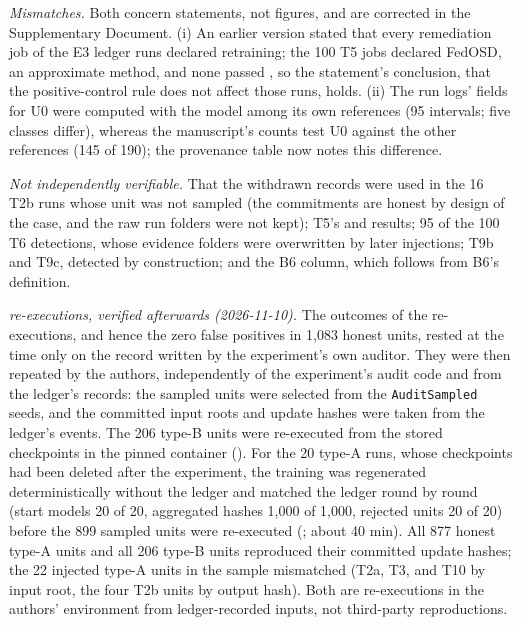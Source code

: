 \emph{Mismatches.} Both concern statements, not figures, and are corrected in the Supplementary Document. (i) An earlier version stated that every remediation job of the E3 ledger runs declared retraining; the 100 T5 jobs declared FedOSD, an approximate method, and none passed \Lthree{}, so the statement's conclusion, that the positive-control rule does not affect those runs, holds. (ii) The run logs' \Lthree{} fields for U0 were computed with the model among its own references (95 intervals; five classes differ), whereas the manuscript's counts test U0 against the other references (145 of 190); the provenance table now notes this difference.

\emph{Not independently verifiable.} That the withdrawn records were used in the 16 T2b runs whose unit was not sampled (the commitments are honest by design of the case, and the raw run folders were not kept); T5's \Lone{} and \Ltwo{} results; 95 of the 100 T6 detections, whose evidence folders were overwritten by later injections; T9b and T9c, detected by construction; and the B6 column, which follows from B6's definition.

\emph{\Lone{} re-executions, verified afterwards (2026-11-10).} The outcomes of the \Lone{} re-executions, and hence the zero false positives in 1,083 honest units, rested at the time only on the record written by the experiment's own auditor. They were then repeated by the authors, independently of the experiment's audit code and from the ledger's records: the sampled units were selected from the \texttt{AuditSampled} seeds, and the committed input roots and update hashes were taken from the ledger's events. The 206 type-B units were re-executed from the stored checkpoints in the pinned container (). For the 20 type-A runs, whose checkpoints had been deleted after the experiment, the training was regenerated deterministically without the ledger and matched the ledger round by round (start models 20 of 20, aggregated hashes 1,000 of 1,000, rejected units 20 of 20) before the 899 sampled units were re-executed (; about 40 min). All 877 honest type-A units and all 206 type-B units reproduced their committed update hashes; the 22 injected type-A units in the sample mismatched (T2a, T3, and T10 by input root, the four T2b units by output hash). Both are re-executions in the authors' environment from ledger-recorded inputs, not third-party reproductions.

